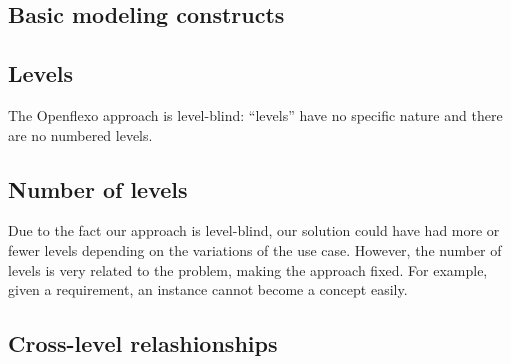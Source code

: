 
  \subsection{Basic modeling constructs}


  \subsection{Levels}


  The Openflexo approach is level-blind: ``levels'' have no specific
  nature and there are no numbered levels. 

  \subsection{Number of levels}

  Due to the fact our approach is level-blind, our solution could have had more
  or fewer levels depending on the variations of the use case. However, the number of levels is very related to the problem, making the approach fixed. For example, given a requirement, an instance cannot become a concept easily.

  \subsection{Cross-level relashionships}


